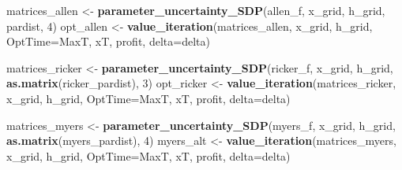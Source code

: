 \documentclass[author-year, review]{elsarticle} %
\newenvironment{Shaded}{}{}
\newcommand{\KeywordTok}[1]{\textcolor[rgb]{0.00,0.44,0.13}{\textbf{{#1}}}}
\newcommand{\DataTypeTok}[1]{\textcolor[rgb]{0.56,0.13,0.00}{{#1}}}
\newcommand{\DecValTok}[1]{\textcolor[rgb]{0.25,0.63,0.44}{{#1}}}
\newcommand{\NormalTok}[1]{{#1}}
\begin{document}
\begin{Shaded}
\end{Shaded}

\begin{Shaded}
\begin{Highlighting}[]
\NormalTok{matrices_allen <- }\KeywordTok{parameter_uncertainty_SDP}\NormalTok{(allen_f, x_grid, h_grid, pardist, }\DecValTok{4}\NormalTok{)}
\NormalTok{opt_allen <- }\KeywordTok{value_iteration}\NormalTok{(matrices_allen, x_grid, h_grid, }\DataTypeTok{OptTime=}\NormalTok{MaxT, xT, profit, }\DataTypeTok{delta=}\NormalTok{delta)}
\end{Highlighting}
\end{Shaded}

\begin{Shaded}
\begin{Highlighting}[]
\NormalTok{matrices_ricker <- }\KeywordTok{parameter_uncertainty_SDP}\NormalTok{(ricker_f, x_grid, h_grid, }\KeywordTok{as.matrix}\NormalTok{(ricker_pardist), }\DecValTok{3}\NormalTok{)}
\NormalTok{opt_ricker <- }\KeywordTok{value_iteration}\NormalTok{(matrices_ricker, x_grid, h_grid, }\DataTypeTok{OptTime=}\NormalTok{MaxT, xT, profit, }\DataTypeTok{delta=}\NormalTok{delta)}
\end{Highlighting}
\end{Shaded}

\begin{Shaded}
\begin{Highlighting}[]
\NormalTok{matrices_myers <- }\KeywordTok{parameter_uncertainty_SDP}\NormalTok{(myers_f, x_grid, h_grid, }\KeywordTok{as.matrix}\NormalTok{(myers_pardist), }\DecValTok{4}\NormalTok{)}
\NormalTok{myers_alt <- }\KeywordTok{value_iteration}\NormalTok{(matrices_myers, x_grid, h_grid, }\DataTypeTok{OptTime=}\NormalTok{MaxT, xT, profit, }\DataTypeTok{delta=}\NormalTok{delta)}
\end{Highlighting}
\end{Shaded}
\end{document}
